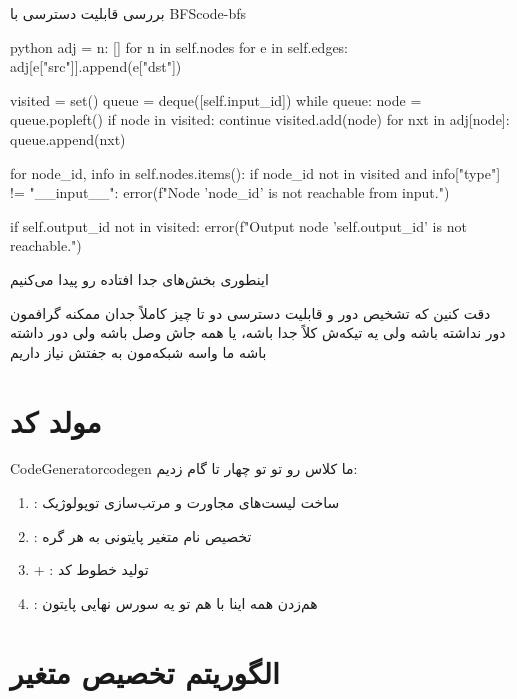 \documentclass{nngraph-fa}
\begin{document}
\begin{codebox}{بررسی قابلیت دسترسی با BFS}{code-bfs}
\begin{amzcode}{python}
adj = {n: [] for n in self.nodes}
for e in self.edges:
    adj[e["src"]].append(e["dst"])

visited = set()
queue   = deque([self.input_id])
while queue:
    node = queue.popleft()
    if node in visited:
        continue
    visited.add(node)
    for nxt in adj[node]:
        queue.append(nxt)

for node_id, info in self.nodes.items():
    if node_id not in visited and info["type"] != "__input__":
        error(f"Node '{node_id}' is not reachable from input.")

if self.output_id not in visited:
    error(f"Output node '{self.output_id}' is not reachable.")
\end{amzcode}
\end{codebox}

اینطوری بخش‌های جدا افتاده رو پیدا می‌کنیم

\begin{notebox}
دقت کنین که تشخیص دور و قابلیت دسترسی دو تا چیز کاملاً جدان
ممکنه گرافمون دور نداشته باشه ولی یه تیکه‌ش کلاً جدا باشه، یا همه جاش وصل باشه ولی دور داشته باشه
ما واسه  شبکه‌مون به جفتش نیاز داریم
\end{notebox}

\section{مولد کد}

\begin{dfnbox}{CodeGenerator}{codegen}
ما کلاس  رو تو  تو چهار تا گام زدیم:
\begin{enumerate}[noitemsep]
    \item {}: ساخت لیست‌های مجاورت و مرتب‌سازی توپولوژیک
    \item {}: تخصیص نام متغیر پایتونی به هر گره
    \item {} + : تولید خطوط کد
    \item {}: هم‌زدن همه اینا با هم تو یه سورس نهایی پایتون
\end{enumerate}
\end{dfnbox}

\section{الگوریتم تخصیص متغیر}
\end{document}
